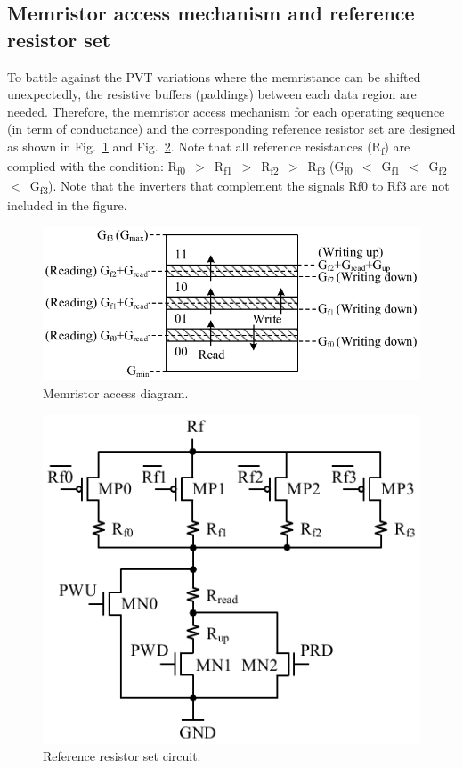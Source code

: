 \documentclass[twocolumn,conference]{IEEEtran}
\begin{document}
\subsection{Memristor access mechanism and reference resistor set}
\label{subsec:MemristorAccessMechanismAndReferenceResistorSet}
To battle against the PVT variations where the memristance can be shifted unexpectedly, the resistive buffers (paddings) between each data region are needed. Therefore, the memristor access mechanism for each operating sequence (in term of conductance) and the corresponding reference resistor set are designed as shown in Fig.~\ref{fig:MemristorAccess} and Fig.~\ref{fig:RSet}. Note that all reference resistances (R\textsubscript{f}) are complied with the condition: R\textsubscript{f0}~$>$~R\textsubscript{f1}~$>$~R\textsubscript{f2}~$>$~R\textsubscript{f3} (G\textsubscript{f0}~$<$~G\textsubscript{f1}~$<$~G\textsubscript{f2}~$<$~G\textsubscript{f3}). Note that the inverters that complement the signals Rf0 to Rf3 are not included in the figure.

\begin{figure}[ht]
    \centering
    \includegraphics[scale=0.65]{figs/MemristorAccessV5}
    \caption{Memristor access diagram.}
    \label{fig:MemristorAccess}
\end{figure}
\begin{figure}[ht]
    \centering
    \includegraphics[scale=0.7]{figs/RSetV5}
    \caption{Reference resistor set circuit.}
    \label{fig:RSet}
\end{figure}
\end{document}

